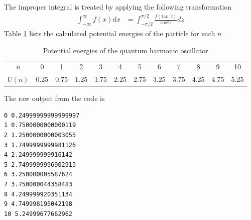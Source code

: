 \documentclass{article}
\begin{document}
\begin{enumerate}
\begin{enumerate}
    The improper integral is treated by applying the following transformation
    \begin{align*}
        \int_{-\infty}^{\infty} f(x) dx &= \int_{-\pi/2}^{\pi/2} \frac{f(\text{tan }z)}{\text{cos}^2 z} dz
    \end{align*}
    Table \ref{tab:3c} lists the calculated potential energies of the particle for each $n$
    \begin{table}[h]
        \centering
        \begin{tabular}{c|c c c c c c c c c c c}
            $n$ & 0 & 1 & 2 & 3 & 4 & 5 & 6 & 7 & 8 & 9 & 10 \\
            $U(n)$ & 0.25 & 0.75 & 1.25 & 1.75 & 2.25 & 2.75 & 3.25 & 3.75 & 4.25 & 4.75 & 5.25
        \end{tabular}
        \caption{Potential energies of the quantum harmonic oscillator}
        \label{tab:3c}
    \end{table}

    The raw output from the code is 
\begin{verbatim}
0 0.24999999999999997
1 0.7500000000000119
2 1.2500000000003055
3 1.7499999999981126
4 2.249999999916142
5 2.7499999996902913
6 3.250000005587624
7 3.750000044358483
8 4.249999920351134
9 4.749998195042198
10 5.24999677662962
\end{verbatim}
\end{enumerate}

\end{enumerate}
\end{document}
